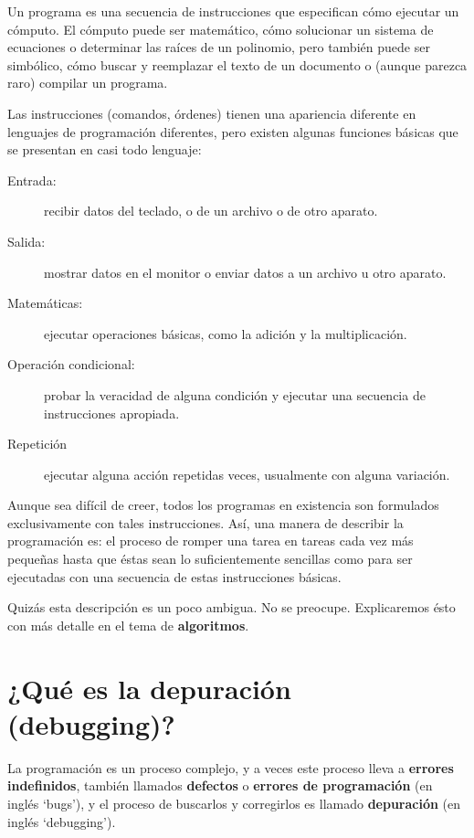 Un programa es una secuencia de instrucciones que especifican cómo
ejecutar un cómputo. El cómputo puede ser matemático, cómo solucionar
un sistema de ecuaciones o determinar las raíces de un polinomio,
pero también puede ser simbólico, cómo buscar y reemplazar el texto
de un documento o (aunque parezca raro) compilar un programa.


Las instrucciones (comandos, órdenes) tienen una apariencia diferente
en lenguajes de programación diferentes, pero existen algunas funciones
básicas que se presentan en casi todo lenguaje:
\begin{description}
\item [{Entrada:}] recibir datos del teclado, o de un archivo o de otro
aparato.
\item [{Salida:}] mostrar datos en el monitor o enviar datos a un archivo
u otro aparato.
\item [{Matemáticas:}] ejecutar operaciones básicas, como la adición y
la multiplicación.
\item [{Operación condicional:}] probar la veracidad de alguna condición
y ejecutar una secuencia de instrucciones apropiada.
\item [{Repetición}] ejecutar alguna acción repetidas veces, usualmente
con alguna variación.
\end{description}
Aunque sea difícil de creer, todos los programas en existencia son
formulados exclusivamente con tales instrucciones. Así, una manera
de describir la programación es: el proceso de romper una tarea en
tareas cada vez más pequeñas hasta que éstas sean lo suficientemente
sencillas como para ser ejecutadas con una secuencia de estas instrucciones
básicas.

Quizás esta descripción es un poco ambigua. No se preocupe. Explicaremos
ésto con más detalle en el tema de \textbf{algoritmos}.

\section{¿Qué es la depuración (debugging)?}

 

La programación es un proceso complejo, y a veces este proceso lleva
a \textbf{errores indefinidos}, también llamados \textbf{defectos}
o \textbf{errores de programación} (en inglés `bugs'), y el proceso
de buscarlos y corregirlos es llamado \textbf{depuración} (en inglés
`debugging').

